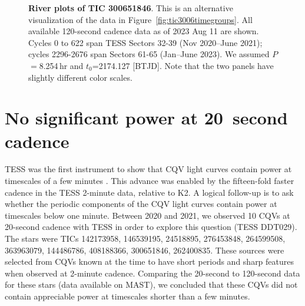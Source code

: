 \documentclass[11pt,twocolumn,tighten]{aastex63}
\begin{document}
\begin{figure*}[!t]
	\begin{center}
	\end{center}
	\vspace{-0.4cm}
	\caption{
		{\bf River plots of TIC 300651846}.
    This is an alternative visualization of the data in
    Figure~\ref{fig:tic3006timegroups}.  All available 120-second
    cadence data as of 2023 Aug 11 are shown.  Cycles 0 to 622 span
    TESS Sectors 32-39 (Nov 2020--June 2021); cycles 2296-2676 span
    Sectors 61-65 (Jan--June 2023).  We assumed $P$$=$8.254\,hr and
    $t_0$=2174.127 [BTJD].  Note that the two panels have slightly
    different color scales.
	}
	\label{fig:tic3006river}
\end{figure*}



\section{No significant power at 20~second cadence}

TESS was the first instrument to show that CQV light curves contain
power at timescales of a few minutes
\citep{2019A&A...625L..13Z,2022AJ....163..144G}.  This advance was
enabled by the fifteen-fold faster cadence in the TESS 2-minute data,
relative to K2.  A logical follow-up is to ask whether the periodic
components of the CQV light curves contain power at timescales below
one minute.  Between 2020 and 2021, we observed 10 CQVs at 20-second
cadence with TESS in order to explore this question (TESS DDT029).
The stars were TICs 142173958, 146539195, 24518895, 276453848,
264599508, 363963079, 144486786, 408188366, 300651846, 262400835.
These sources were selected from CQVs known at the time to have short
periods and sharp features when observed at 2-minute cadence.
Comparing the 20-second to 120-second data for these stars (data
available on MAST), we concluded that these CQVs did not contain
appreciable power at timescales shorter than a few minutes.
\end{document}
